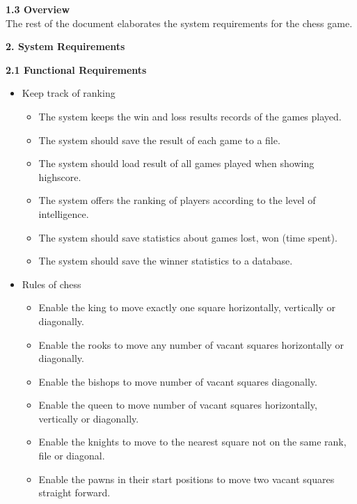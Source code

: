 \documentclass{article}
\begin{document}
\begin{flushleft}
\begin{itemize}
\end{itemize}

\vspace{5mm}
\textbf{1.3	Overview}\\
\vspace{1mm}
The rest of the document elaborates the system requirements for the chess game.\\
\vspace{10mm}

\begin{Large}\textbf{2.	System Requirements}\\
\end{Large}
\vspace{3mm}
\textbf{2.1	Functional Requirements}\\
\begin{itemize}
	\item Keep track of ranking
	\begin{itemize}
		\item The system keeps the win and loss results records of the games played.
		\item The system should save the result of each game to a file.
		\item The system should load result of all games played when showing highscore.
		\item The system offers the ranking of players according to the level of intelligence.
		\item The system should save statistics about games lost, won (time spent).
		\item The system should save the winner statistics to a database.
	\end{itemize}
	\item Rules of chess
	\begin{itemize}
		\item Enable the king to move exactly one square horizontally, vertically or diagonally.
		\item Enable the rooks to move any number of vacant squares horizontally or diagonally. 
		\item Enable the bishops to move number of vacant squares diagonally.
		\item Enable the queen to move number of vacant squares horizontally, vertically or diagonally.
		\item Enable the knights to move to the nearest square not on the same rank, file or diagonal. 
		\item Enable the pawns in their start positions to move two  vacant squares straight forward.

\end{itemize}
\end{itemize}
\end{flushleft}
\end{document}
